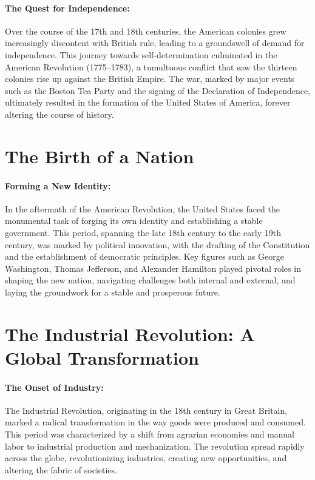 \documentclass[a4paper,12pt]{book}
\begin{document}
\paragraph{The Quest for Independence:}
Over the course of the 17th and 18th centuries, the American colonies grew increasingly discontent with British rule, leading to a groundswell of demand for independence. This journey towards self-determination culminated in the American Revolution (1775–1783), a tumultuous conflict that saw the thirteen colonies rise up against the British Empire. The war, marked by major events such as the Boston Tea Party and the signing of the Declaration of Independence, ultimately resulted in the formation of the United States of America, forever altering the course of history.

\section*{The Birth of a Nation}

\paragraph{Forming a New Identity:}
In the aftermath of the American Revolution, the United States faced the monumental task of forging its own identity and establishing a stable government. This period, spanning the late 18th century to the early 19th century, was marked by political innovation, with the drafting of the Constitution and the establishment of democratic principles. Key figures such as George Washington, Thomas Jefferson, and Alexander Hamilton played pivotal roles in shaping the new nation, navigating challenges both internal and external, and laying the groundwork for a stable and prosperous future.

\section*{The Industrial Revolution: A Global Transformation}

\paragraph{The Onset of Industry:}
The Industrial Revolution, originating in the 18th century in Great Britain, marked a radical transformation in the way goods were produced and consumed. This period was characterized by a shift from agrarian economies and manual labor to industrial production and mechanization. The revolution spread rapidly across the globe, revolutionizing industries, creating new opportunities, and altering the fabric of societies.
\end{document}
